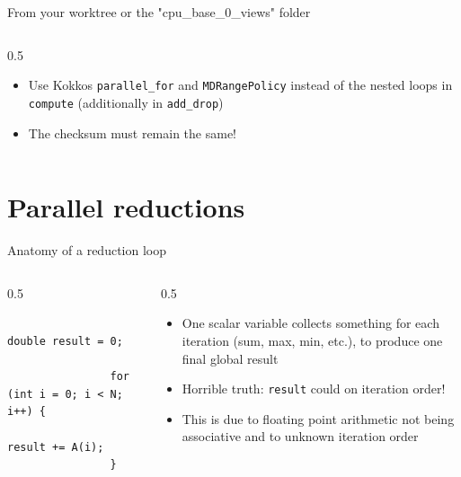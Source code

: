 \documentclass[
    aspectratio=169,
]{beamer}
\begin{document}
\begin{exerciseframe}{\small From your worktree or the "cpu\_base\_0\_views" folder}
    \begin{columns}
        \begin{column}{0.5\linewidth}
            \begin{itemize}
                \item Use Kokkos \texttt{parallel\_for} and \texttt{MDRangePolicy} instead of the nested loops in \texttt{compute} (additionally in \texttt{add\_drop})
                \item The checksum must remain the same!
            \end{itemize}
        \end{column}
    \end{columns}
\end{exerciseframe}

\section{Parallel reductions}

\begin{frame}[fragile]{Anatomy of a reduction loop}
    \begin{columns}
        \begin{column}{0.5\linewidth}
            \begin{verbatim}
                double result = 0;

                for (int i = 0; i < N; i++) {
                    result += A(i);
                }
            \end{verbatim}
        \end{column}
        \begin{column}{0.5\linewidth}
            \begin{itemize}
                \item One scalar variable collects something for each iteration (sum, max, min, etc.), to produce one final global result
                \pause
                \item Horrible truth: \texttt{result} could  on iteration order!
                \item This is due to floating point arithmetic not being associative and to unknown iteration order
            \end{itemize}
        \end{column}
    \end{columns}
\end{frame}
\end{document}
